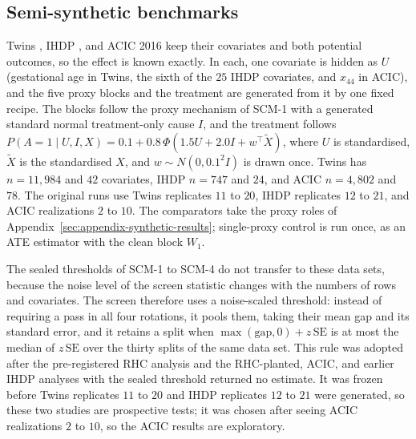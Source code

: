 \subsection{Semi-synthetic benchmarks}
\label{sec:appendix-benchmarks}

Twins \citep{louizos2017causal}, IHDP \citep{hill2011bayesian}, and ACIC 2016 \citep{dorie2019automated} keep their covariates and both potential outcomes, so the effect is known exactly. In each, one covariate is hidden as $U$ (gestational age in Twins, the sixth of the $25$ IHDP covariates, and $x_{44}$ in ACIC), and the five proxy blocks and the treatment are generated from it by one fixed recipe. The blocks follow the proxy mechanism of SCM-1 with a generated standard normal treatment-only cause $I$, and the treatment follows $P(A=1\mid U,I,X)=0.1+0.8\,\Phi(1.5U+2.0I+w^\top\tilde X)$, where $U$ is standardised, $\tilde X$ is the standardised $X$, and $w\sim N(0,0.1^2I)$ is drawn once. Twins has $n=11{,}984$ and $42$ covariates, IHDP $n=747$ and $24$, and ACIC $n=4{,}802$ and $78$. The original runs use Twins replicates $11$ to $20$, IHDP replicates $12$ to $21$, and ACIC realizations $2$ to $10$. The comparators take the proxy roles of Appendix~\ref{sec:appendix-synthetic-results}; single-proxy control is run once, as an ATE estimator with the clean block $W_1$.

The sealed thresholds of SCM-1 to SCM-4 do not transfer to these data sets, because the noise level of the screen statistic changes with the numbers of rows and covariates. The screen therefore uses a noise-scaled threshold: instead of requiring a pass in all four rotations, it pools them, taking their mean gap and its standard error, and it retains a split when $\max(\mathrm{gap},0)+z\,\mathrm{SE}$ is at most the median of $z\,\mathrm{SE}$ over the thirty splits of the same data set. This rule was adopted after the pre-registered RHC analysis and the RHC-planted, ACIC, and earlier IHDP analyses with the sealed threshold returned no estimate. It was frozen before Twins replicates $11$ to $20$ and IHDP replicates $12$ to $21$ were generated, so these two studies are prospective tests; it was chosen after seeing ACIC realizations $2$ to $10$, so the ACIC results are exploratory.

